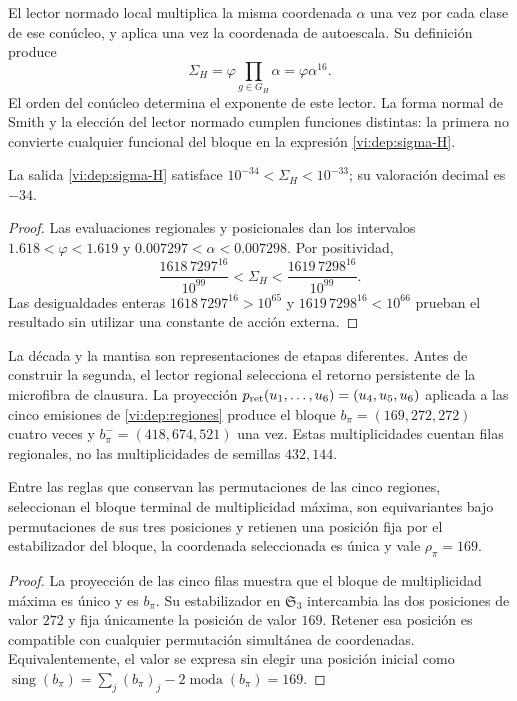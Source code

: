 El lector normado local multiplica la misma coordenada \(\alpha\)
una vez por cada clase de ese conúcleo, y aplica una vez la coordenada
de autoescala. Su definición produce
\begin{equation}
 \Sigma_H=\varphi\prod_{g\in G_H}\alpha
         =\varphi\alpha^{16}.
 \label{vi:dep:sigma-H}
\end{equation}
El orden del conúcleo determina el exponente de este lector. La forma
normal de Smith y la elección del lector normado cumplen funciones
distintas: la primera no convierte cualquier funcional del bloque en
la expresión \eqref{vi:dep:sigma-H}.

\begin{proposition}
\label{vi:dep:decada}
La salida \eqref{vi:dep:sigma-H} satisface
\(10^{-34}<\Sigma_H<10^{-33}\); su valoración decimal es \(-34\).
\end{proposition}
\begin{proof}
Las evaluaciones regionales y posicionales dan los intervalos
\(1.618<\varphi<1.619\) y \(0.007297<\alpha<0.007298\).
Por positividad,
\[
 \frac{1618\,7297^{16}}{10^{99}}
 <\Sigma_H<
 \frac{1619\,7298^{16}}{10^{99}}.
\]
Las desigualdades enteras
\(1618\,7297^{16}>10^{65}\) y
\(1619\,7298^{16}<10^{66}\) prueban el resultado sin utilizar una
constante de acción externa.
\end{proof}

La década y la mantisa son representaciones de etapas diferentes.
Antes de construir la segunda, el lector regional selecciona el retorno
persistente de la microfibra de clausura. La proyección
\(p_{\rm ret}(u_1,\ldots,u_6)=(u_4,u_5,u_6)\) aplicada a las
cinco emisiones de \ref{vi:dep:regiones} produce el bloque
\(b_\pi=(169,272,272)\) cuatro veces y
\(b_\pi^-=(418,674,521)\) una vez. Estas multiplicidades cuentan
filas regionales, no las multiplicidades de semillas \(432,144\).

\begin{proposition}
\label{vi:dep:selector169}
Entre las reglas que conservan las permutaciones de las cinco regiones,
seleccionan el bloque terminal de multiplicidad máxima, son equivariantes
bajo permutaciones de sus tres posiciones y retienen una posición fija
por el estabilizador del bloque, la coordenada seleccionada es única
y vale \(\rho_\pi=169\).
\end{proposition}
\begin{proof}
La proyección de las cinco filas muestra que el bloque de multiplicidad
máxima es único y es \(b_\pi\). Su estabilizador en
\(\mathfrak S_3\) intercambia las dos posiciones de valor \(272\)
y fija únicamente la posición de valor \(169\). Retener esa posición
es compatible con cualquier permutación simultánea de coordenadas.
Equivalentemente, el valor se expresa sin elegir una posición inicial
como
\(\operatorname{sing}(b_\pi)=\sum_j(b_\pi)_j
-2\operatorname{moda}(b_\pi)=169\).
\end{proof}

